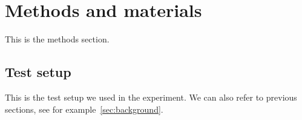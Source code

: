 \section{Methods and materials}

This is the methods section.

\subsection{Test setup}\label{sec:test_setup}

This is the test setup we used in the experiment. We can also refer to previous sections, see for example~\ref{sec:background}.
